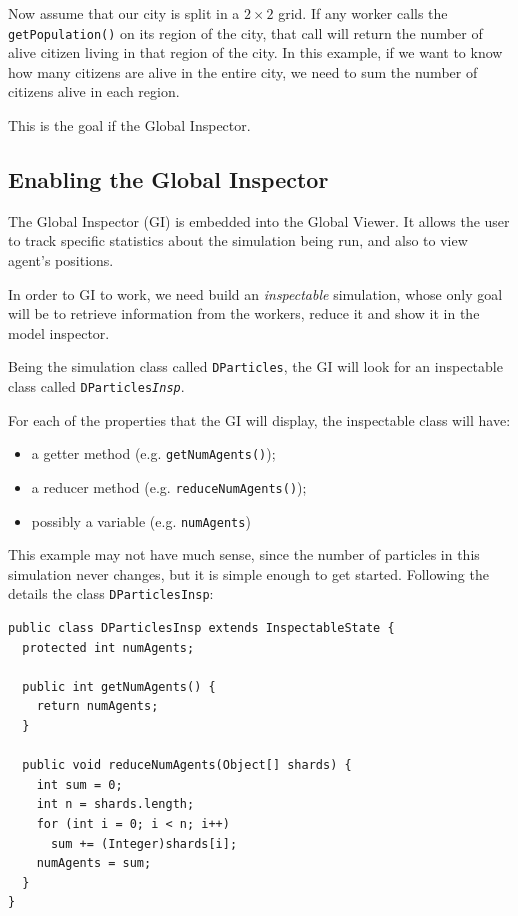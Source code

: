 \documentclass{article}
\begin{document}
Now assume that our city is split in a $2\times2$ grid. If any worker calls the \texttt{getPopulation()} on its region of the city, that call will return the number of alive citizen living in that region of the city. In this example, if we want to know how many citizens are alive in the entire city, we need to sum the number of citizens alive in each region.

This is the goal if the Global Inspector.

\subsection{Enabling the Global Inspector}
The Global Inspector (GI) is embedded into the Global Viewer. It allows the user to track specific statistics about the simulation being run, and also to view agent's positions.

In order to GI to work, we need build an \emph{inspectable} simulation, whose only goal will be to retrieve information from the workers, reduce it and show it in the model inspector.

Being the simulation class called \texttt{DParticles}, the GI will look for an inspectable class called  \texttt{DParticles\emph{Insp}}.

For each of the properties that the GI will display, the inspectable class will have:

\begin{itemize}
	\item a getter method (e.g. \texttt{getNumAgents()});  
  \item a reducer method (e.g. \texttt{reduceNumAgents()});
  \item possibly a variable (e.g. \texttt{numAgents})
\end{itemize}

This example may not have much sense, since the number of particles in this simulation never changes, but it is simple enough to get started. Following the details the class \texttt{DParticlesInsp}:

\begin{lstlisting}
public class DParticlesInsp extends InspectableState {
  protected int numAgents;

  public int getNumAgents() {
    return numAgents;
  }

  public void reduceNumAgents(Object[] shards) {
    int sum = 0;
    int n = shards.length;
    for (int i = 0; i < n; i++)
      sum += (Integer)shards[i];
    numAgents = sum;
  }
}
\end{lstlisting}
\end{document}
